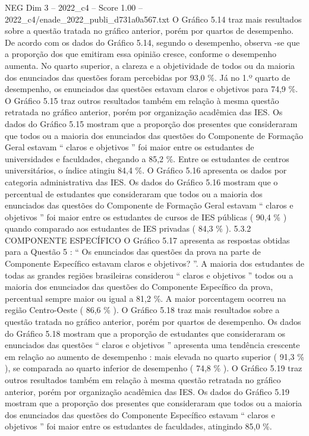 \begin{textsample}{NEG Dim 3 – 2022\_c4 – Score 1.00 – 2022\_c4/enade\_2022\_publi\_d731a0a567.txt}
O Gráfico 5.14 traz mais resultados sobre a questão tratada no gráfico anterior, porém por quartos de desempenho.
De acordo com os dados do Gráfico 5.14, segundo o desempenho, observa -se que a proporção dos que emitiram essa opinião cresce, conforme o desempenho aumenta.
No quarto superior, a clareza e a objetividade de todos ou da maioria dos enunciados das questões foram percebidas por 93,0 \%.
Já no 1.º quarto de desempenho, os enunciados das questões estavam claros e objetivos para 74,9 \%.
O Gráfico 5.15 traz outros resultados também em relação à mesma questão retratada no gráfico anterior, porém por organização acadêmica das IES.
Os dados do Gráfico 5.15 mostram que a proporção dos presentes que consideraram que todos ou a maioria dos enunciados das questões do Componente de Formação Geral estavam “ claros e objetivos ” foi maior entre os estudantes de universidades e faculdades, chegando a 85,2 \%.
Entre os estudantes de centros universitários, o índice atingiu 84,4 \%.
O Gráfico 5.16 apresenta os dados por categoria administrativa das IES.
Os dados do Gráfico 5.16 mostram que o percentual de estudantes que consideraram que todos ou a maioria dos enunciados das questões do Componente de Formação Geral estavam “ claros e objetivos ” foi maior entre os estudantes de cursos de IES públicas ( 90,4 \% ) quando comparado aos estudantes de IES privadas ( 84,3 \% ). 5.3.2 COMPONENTE ESPECÍFICO O Gráfico 5.17 apresenta as respostas obtidas para a Questão 5 : “ Os enunciados das questões da prova na parte de Componente Específico estavam claros e objetivos? ”.
A maioria dos estudantes de todas as grandes regiões brasileiras considerou “ claros e objetivos ” todos ou a maioria dos enunciados das questões do Componente Específico da prova, percentual sempre maior ou igual a 81,2 \%.
A maior porcentagem ocorreu na região Centro-Oeste ( 86,6 \% ).
O Gráfico 5.18 traz mais resultados sobre a questão tratada no gráfico anterior, porém por quartos de desempenho.
Os dados do Gráfico 5.18 mostram que a proporção de estudantes que consideraram os enunciados das questões “ claros e objetivos ” apresenta uma tendência crescente em relação ao aumento de desempenho : mais elevada no quarto superior ( 91,3 \% ), se comparada ao quarto inferior de desempenho ( 74,8 \% ).
O Gráfico 5.19 traz outros resultados também em relação à mesma questão retratada no gráfico anterior, porém por organização acadêmica das IES.
Os dados do Gráfico 5.19 mostram que a proporção dos presentes que consideraram que todos ou a maioria dos enunciados das questões do Componente Específico estavam “ claros e objetivos ” foi maior entre os estudantes de faculdades, atingindo 85,0 \%.

\end{textsample}

